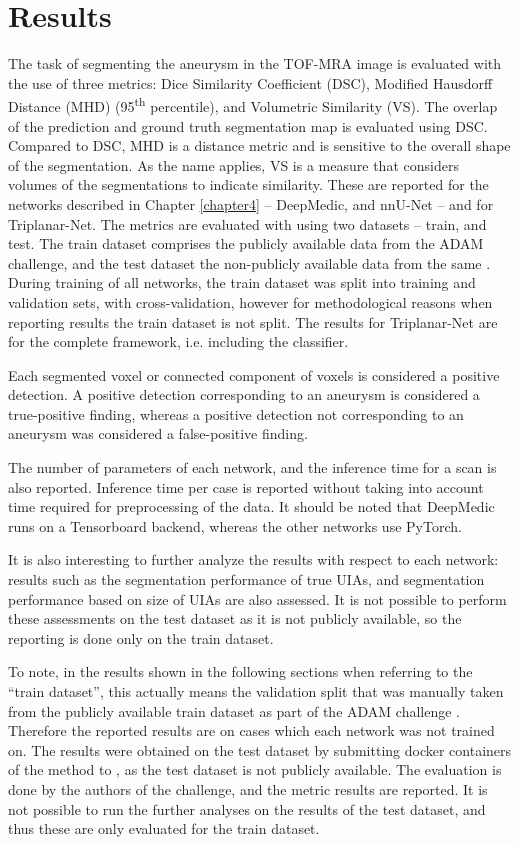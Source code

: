 \chapter{Results}
\label{chapter6}

The task of segmenting the aneurysm in the TOF-MRA image is evaluated with the use of three metrics: Dice Similarity Coefficient (DSC), Modified Hausdorff Distance (MHD) (95\textsuperscript{th} percentile), and Volumetric Similarity (VS). The overlap of the prediction and ground truth segmentation map is evaluated using DSC. Compared to DSC, MHD is a distance metric and is sensitive to the overall shape of the segmentation. As the name applies, VS is a measure that considers volumes of the segmentations to indicate similarity. These are reported for the networks described in Chapter \ref{chapter4} -- DeepMedic, and nnU-Net -- and for Triplanar-Net. The metrics are evaluated with using two datasets -- train, and test. The train dataset comprises the publicly available data from the ADAM challenge, and the test dataset the non-publicly available data from the same \cite{Timmins2020}. During training of all networks, the train dataset was split into training and validation sets, with cross-validation, however for methodological reasons when reporting results the train dataset is not split. The results for Triplanar-Net are for the complete framework, i.e. including the classifier.

Each segmented voxel or connected component of voxels is considered a positive detection. A positive detection corresponding to an aneurysm is considered a true-positive finding, whereas a positive detection not corresponding to an aneurysm was considered a false-positive finding.

The number of parameters of each network, and the inference time for a scan is also reported. Inference time per case is reported without taking into account time required for preprocessing of the data. It should be noted that DeepMedic runs on a Tensorboard backend, whereas the other networks use PyTorch. 

It is also interesting to further analyze the results with respect to each network: results such as the segmentation performance of true UIAs, and segmentation performance based on size of UIAs are also assessed. It is not possible to perform these assessments on the test dataset as it is not publicly available, so the reporting is done only on the train dataset. 

To note, in the results shown in the following sections when referring to the ``train dataset'', this actually means the validation split that was manually taken from the publicly available train dataset as part of the ADAM challenge \cite{Timmins2020}. Therefore the reported results are on cases which each network was not trained on. The results were obtained on the test dataset by submitting docker containers of the method to \citeauthor{Timmins2020}, as the test dataset is not publicly available. The evaluation is done by the authors of the challenge, and the metric results are reported. It is not possible to run the further analyses on the results of the test dataset, and thus these are only evaluated for the train dataset.
 

